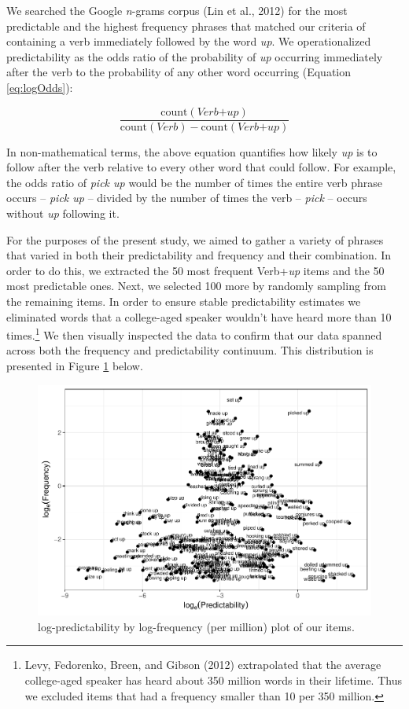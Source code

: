 \documentclass[
  man,floatsintext]{apa6}
\begin{document}
We searched the Google \emph{n}-grams corpus (Lin et al., 2012) for the most predictable and the highest frequency phrases that matched our criteria of containing a verb immediately followed by the word \emph{up}. We operationalized predictability as the odds ratio of the probability of \emph{up} occurring immediately after the verb to the probability of any other word occurring (Equation \eqref{eq:logOdds}):

\begin{equation}
\label{eq:logOdds}
\frac{\mathrm{count(\textit{Verb+up})}}{\mathrm{count(\textit{Verb})} - \mathrm{count(\textit{Verb+up})}} 
\end{equation}

In non-mathematical terms, the above equation quantifies how likely \emph{up} is to follow after the verb relative to every other word that could follow. For example, the odds ratio of \emph{pick up} would be the number of times the entire verb phrase occurs -- \emph{pick up} -- divided by the number of times the verb -- \emph{pick} -- occurs without \emph{up} following it.

For the purposes of the present study, we aimed to gather a variety of phrases that varied in both their predictability and frequency and their combination. In order to do this, we extracted the 50 most frequent Verb+\emph{up} items and the 50 most predictable ones. Next, we selected 100 more by randomly sampling from the remaining items. In order to ensure stable predictability estimates we eliminated words that a college-aged speaker wouldn't have heard more than 10 times.\footnote{Levy, Fedorenko, Breen, and Gibson (2012) extrapolated that the average college-aged speaker has heard about 350 million words in their lifetime. Thus we excluded items that had a frequency smaller than 10 per 350 million.} We then visually inspected the data to confirm that our data spanned across both the frequency and predictability continuum. This distribution is presented in Figure \ref{fig:stimplot2} below.

\begin{figure}

{\centering \includegraphics[width=0.8\linewidth]{write-up_files/figure-latex/stimplot2-1} 

}

\caption{log-predictability by log-frequency (per million) plot of our items.}\label{fig:stimplot2}
\end{figure}
\end{document}
